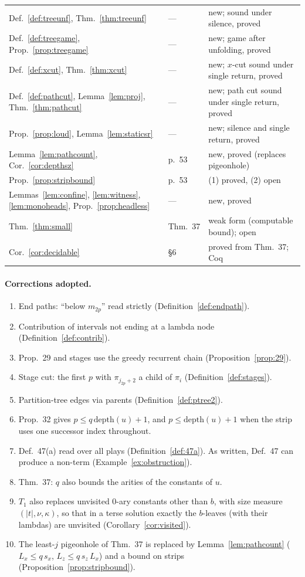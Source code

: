 \documentclass[11pt]{article}
\newcommand{\depth}{\mathrm{depth}}
\theoremstyle{plain}
\theoremstyle{definition}
\theoremstyle{remark}
\begin{document}
\begin{center}
\begin{tabular}{lll}
Def.~\ref{def:treeunf}, Thm.~\ref{thm:treeunf} & --- & new; sound under silence, proved\\
Def.~\ref{def:treegame}, Prop.~\ref{prop:treegame} & --- & new; game after unfolding, proved\\
Def.~\ref{def:xcut}, Thm.~\ref{thm:xcut} & --- & new; $x$-cut sound under single return, proved\\
Def.~\ref{def:pathcut}, Lemma~\ref{lem:proj}, Thm.~\ref{thm:pathcut} & --- & new; path cut sound under single return, proved\\
Prop.~\ref{prop:loud}, Lemma~\ref{lem:staticsr} & --- & new; silence and single return, proved\\
Lemma~\ref{lem:pathcount}, Cor.~\ref{cor:depthsz} & p.~53 & new, proved (replaces pigeonhole)\\
Prop.~\ref{prop:stripbound} & p.~53 & (1) proved, (2) open\\
Lemmas~\ref{lem:confine}, \ref{lem:witness}, \ref{lem:monoheads}, Prop.~\ref{prop:headless} & --- & new, proved\\
Thm.~\ref{thm:small} & Thm.~37 & weak form (computable bound); open\\
Cor.~\ref{cor:decidable} & \S6 & proved from Thm.~37; Coq
\end{tabular}
\end{center}

\paragraph{Corrections adopted.}
\begin{enumerate}
\item End paths: ``below $m_{2p}$'' read strictly
  (Definition~\ref{def:endpath}).
\item Contribution of intervals not ending at a lambda node
  (Definition~\ref{def:contrib}).
\item Prop.~29 and stages use the greedy recurrent chain
  (Proposition~\ref{prop:29}).
\item Stage cut: the first $p$ with $\pi_{j_{2p}+2}$ a child of $\pi_i$
  (Definition~\ref{def:stages}).
\item Partition-tree edges via parents (Definition~\ref{def:ptree2}).
\item Prop.~32 gives $p\le q\,\depth(u)+1$, and $p\le\depth(u)+1$ when the
  strip uses one successor index throughout.
\item Def.~47(a) read over all plays (Definition~\ref{def:47a}).  As
  written, Def.~47 can produce a non-term
  (Example~\ref{ex:obstruction}).
\item Thm.~37: $q$ also bounds the arities of the constants of $u$.
\item $T_1$ also replaces unvisited 0-ary constants other than $b$, with
  size measure $(|t|,\nu,\kappa)$, so that in a terse solution exactly
  the $b$-leaves (with their lambdas) are unvisited
  (Corollary~\ref{cor:visited}).
\item The least-$j$ pigeonhole of Thm.~37 is replaced by
  Lemma~\ref{lem:pathcount} ($L_x\le q\,s_x$, $L_z\le q\,s_z\,L_x$) and a
  bound on strips (Proposition~\ref{prop:stripbound}).
\end{enumerate}
\end{document}
